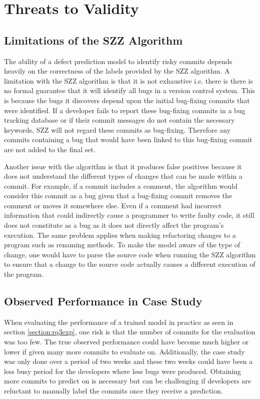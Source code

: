 \documentclass[../main.tex]{subfiles}
\begin{document}
\section{Threats to Validity}

\subsection{Limitations of the SZZ Algorithm}

The ability of a defect prediction model to identify risky commits depends heavily on the correctness of the labels provided by the SZZ algorithm. A limitation with the SZZ algorithm is that it is not exhaustive i.e. there is there is no formal guarantee that it will identify all bugs in a version control system. This is because the bugs it discovers depend upon the initial bug-fixing commits that were identified. If a developer fails to report these bug-fixing commits in a bug tracking database or if their commit messages do not contain the necessary keywords, SZZ will not regard these commits as bug-fixing. Therefore any commits containing a bug that would have been linked to this bug-fixing commit are not added to the final set. 

Another issue with the algorithm is that it produces false positives because it does not understand the different types of changes that can be made within a commit. For example, if a commit includes a comment, the algorithm would consider this commit as a bug given that a bug-fixing commit removes the comment or moves it somewhere else. Even if a comment had incorrect information that could indirectly cause a programmer to write faulty code, it still does not constitute as a bug as it does not directly affect the program's execution. The same problem applies when making refactoring changes to a program such as renaming methods. To make the model aware of the type of change, one would have to parse the source code when running the SZZ algorithm to ensure that a change to the source code actually causes a different execution of the program.

\subsection{Observed Performance in Case Study}

When evaluating the performance of a trained model in practice as seen in section \ref{section:rq3exp}, one risk is that the number of commits for the evaluation was too few. The true observed performance could have become much higher or lower if given many more commits to evaluate on. Additionally, the case study was only done over a period of two weeks and these two weeks could have been a less busy period for the developers where less bugs were produced. Obtaining more commits to predict on is necessary but can be challenging if developers are reluctant to manually label the commits once they receive a prediction. 
\end{document}
